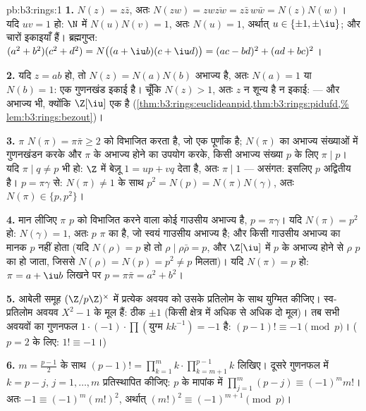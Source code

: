 \begin{solution}{pb:b3:rings:1}
\textbf{1.} $N(z) = z\bar z$, अतः $N(zw) = zw\overline{zw} = z\bar
z\, w \bar w = N(z)N(w)$। यदि $uv = 1$ हो: $\N$ में $N(u)N(v) = 1$, अतः
$N(u) = 1$, अर्थात् $u \in \{\pm 1, \pm \iu\}$; और चारों इकाइयाँ हैं। ब्रह्मगुप्त: $(a^2+b^2)(c^2+d^2) = N\bigl((a + \iu b)(c + \iu
d)\bigr) = (ac - bd)^2 + (ad + bc)^2$।

\textbf{2.} यदि $z = ab$ हो, तो $N(z) = N(a)N(b)$ अभाज्य है, अतः $N(a) = 1$ या $N(b) = 1$:
एक गुणनखंड इकाई है। चूँकि $N(z) > 1$, अतः $z$ न शून्य है न इकाई:
 --- और अभाज्य भी, क्योंकि $\Z[\iu]$ एक  है (\cref{thm:b3:rings:euclideanpid,thm:b3:rings:pidufd,%
lem:b3:rings:bezout})।

\textbf{3.} $\pi$ $N(\pi) = \pi\bar\pi \geq 2$ को विभाजित करता है, जो एक पूर्णांक है; $N(\pi)$
का अभाज्य संख्याओं में गुणनखंडन करके और $\pi$ के अभाज्य होने का
उपयोग करके, किसी अभाज्य संख्या $p$ के लिए $\pi \mid p$। यदि $\pi \mid q \neq p$ भी हो:
$\Z$ में बेज़ू $1 = up + vq$ देता है, अतः $\pi \mid 1$ --- असंगत: इसलिए $p$
अद्वितीय है। $p = \pi\gamma$ से: $N(\pi) \neq 1$ के साथ $p^2 = N(p) = N(\pi)N(\gamma)$, अतः $N(\pi)
\in \{p, p^2\}$।

\textbf{4.} मान लीजिए $\pi$ $p$ को विभाजित करने वाला कोई गाउसीय
अभाज्य है, $p =
\pi\gamma$। यदि $N(\pi) = p^2$ हो: $N(\gamma) = 1$, अतः $p$ $\pi$ का 
है, जो स्वयं गाउसीय अभाज्य है; और किसी गाउसीय अभाज्य का मानक $p$
नहीं होता (यदि $N(\rho) = p$ हो तो $\rho \mid
\rho\bar\rho = p$, और $\Z[\iu]$ में $p$ के अभाज्य होने
से $\rho$ $p$ का  हो जाता, जिससे $N(\rho) = N(p) = p^2 \neq
p$ मिलता)। यदि $N(\pi) = p$ हो:
$\pi = a + \iu b$ लिखने पर $p = \pi\bar\pi = a^2
+ b^2$।

\textbf{5.} आबेली समूह $(\Z/p\Z)^\times$ में प्रत्येक अवयव को उसके प्रतिलोम के
साथ युग्मित कीजिए। स्व-प्रतिलोम अवयव $X^2 - 1$ के मूल हैं: ठीक $\pm 1$
(किसी क्षेत्र में अधिक से अधिक दो मूल)। तब सभी अवयवों का गुणनफल
$1 \cdot (-1) \cdot \prod
(\text{युग्म } k k^{-1}) = -1$ है: $(p-1)! \equiv -1 \pmod p$। ($p = 2$ के लिए: $1! \equiv -1$।)

\textbf{6.} $m = \frac{p-1}2$ के साथ $(p-1)! = \prod_{k=1}^m k \cdot
\prod_{k=m+1}^{p-1}k$ लिखिए। दूसरे गुणनफल में $k = p - j$, $j = 1, \dots, m$
प्रतिस्थापित कीजिए: $p$ के मापांक में $\prod_{j=1}^m (p - j) \equiv (-1)^m m!$। अतः $-1 \equiv
(-1)^m (m!)^2$, अर्थात्
$(m!)^2 \equiv (-1)^{m+1} \pmod p$।


\end{solution}
